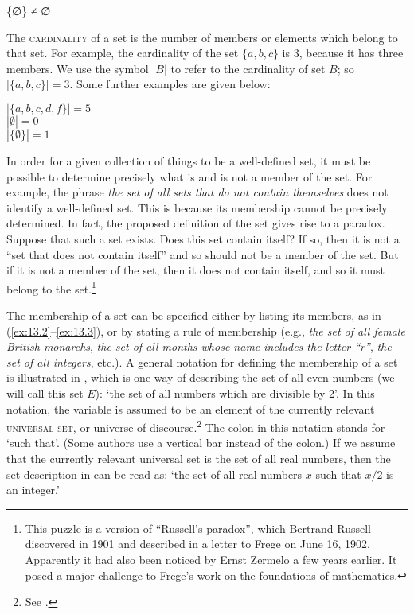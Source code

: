 \ea \label{ex:13.4}
  \{∅\} ≠ ∅
\z


The \textsc{cardinality} of a set is the number of members or elements which belong to that set. For example, the cardinality of the set $\{a,b,c\}$ is 3, because it has three members. We use the symbol $|B|$ to refer to the cardinality of set $B$; so $|\{a,b,c\}| = 3$. Some further examples are given below:


\ea \label{ex:13.5}
$|\{a,b,c,d,f\}| = 5$\\
$|\text{∅}| = 0$\\
$|\{\text{∅}\}| = 1$
\z


In order for a given collection of things to be a well-defined set, it must be possible to determine precisely what is and is not a member of the set. For example, the phrase \textit{the set of all sets that do not contain themselves} does not identify a well-defined set. This is because its membership cannot be precisely determined. In fact, the proposed definition of the set gives rise to a paradox. Suppose that such a set exists. Does this set contain itself? If so, then it is not a “set that does not contain itself” and so should not be a member of the set. But if it is not a member of the set, then it does not contain itself, and so it must belong to the set.\footnote{This puzzle is a version of “Russell’s paradox”, which Bertrand Russell discovered in 1901 and described in a letter to Frege on June 16, 1902. Apparently it had also been noticed by Ernst Zermelo a few years earlier. It posed a major challenge to Frege’s work on the foundations of mathematics.}



The membership of a set can be specified either by listing its members, as in (\ref{ex:13.2}--\ref{ex:13.3}), or by stating a rule of membership (e.g., \textit{the set of all female British monarchs}, \textit{the set of all months whose name includes the letter “r”}, \textit{the set of all integers}, etc.). A general notation for defining the membership of a set is illustrated in , which is one way of describing the set of all even numbers (we will call this set $E$): ‘the set of all numbers which are divisible by 2’. In this notation, the variable is assumed to be an element of the currently relevant \textsc{universal set}, or universe of discourse.\footnote{See .} The colon in this notation stands for ‘such that’. (Some authors use a vertical bar {\textbar} instead of the colon.) If we assume that the currently relevant universal set is the set of all real numbers, then the set description in  can be read as: ‘the set of all real numbers $x$ such that $x/2$ is an integer.’



